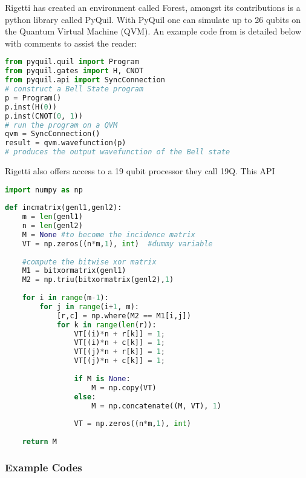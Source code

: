 Rigetti has created an environment called Forest, amongst its contributions is a python library called PyQuil. With PyQuil one can simulate up to 26 qubits on the Quantum Virtual Machine (QVM). An example code from \cite{rigetti} is detailed below with comments to assist the reader:
\begin{lstlisting}[language=Python]
from pyquil.quil import Program
from pyquil.gates import H, CNOT
from pyquil.api import SyncConnection
# construct a Bell State program
p = Program()
p.inst(H(0))
p.inst(CNOT(0, 1))
# run the program on a QVM
qvm = SyncConnection()
result = qvm.wavefunction(p) 
# produces the output wavefunction of the Bell state
\end{lstlisting}
Rigetti also offers access to a 19 qubit processor they call 19Q. This API 
\begin{lstlisting}[language=Python]
import numpy as np
 
def incmatrix(genl1,genl2):
    m = len(genl1)
    n = len(genl2)
    M = None #to become the incidence matrix
    VT = np.zeros((n*m,1), int)  #dummy variable
 
    #compute the bitwise xor matrix
    M1 = bitxormatrix(genl1)
    M2 = np.triu(bitxormatrix(genl2),1) 
 
    for i in range(m-1):
        for j in range(i+1, m):
            [r,c] = np.where(M2 == M1[i,j])
            for k in range(len(r)):
                VT[(i)*n + r[k]] = 1;
                VT[(i)*n + c[k]] = 1;
                VT[(j)*n + r[k]] = 1;
                VT[(j)*n + c[k]] = 1;
 
                if M is None:
                    M = np.copy(VT)
                else:
                    M = np.concatenate((M, VT), 1)
 
                VT = np.zeros((n*m,1), int)
 
    return M
\end{lstlisting}

\subsubsection{Example Codes}


